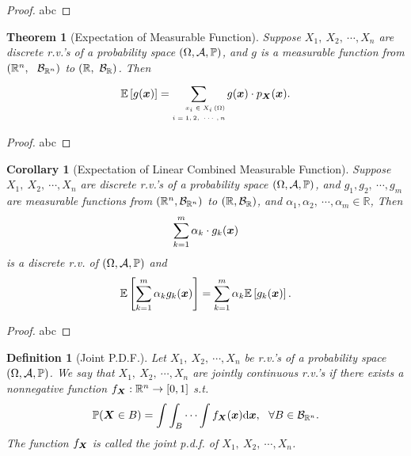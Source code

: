 \documentclass[openany,12pt]{book}
\newtheorem{theorem}{Theorem}[chapter]
\newtheorem{corollary}{Corollary}[chapter]
\newtheorem{definition}{Definition}[chapter]
\begin{document}
\begin{proof}
  abc
\end{proof}

\begin{theorem}[Expectation of Measurable Function]
Suppose $X_1,\ X_2,\ \cdots,X_n$ are discrete r.v.'s of a probability space $(\Omega,\mathcal{A},\mathbb{P})$, and $g$ is a measurable function from $(\mathbb{R}^n,\ \ \mb_{\mathbb{R}^n})$ to $(\mathbb{R},\ \mathcal{B}_\mathbb{R})$. Then
\[\mathbb{E}\left[ g(\bm{x}) \right] = \sum_{\mbox{\tiny$\begin{aligned}
x_{i} \in X_{i}\left( \Omega \right) \\
i = 1,2,\ \cdots,n \\
\end{aligned}$}}^{}{g(\bm{x}) \cdot p_{\bm{X}}(\bm{x}).}\]
\end{theorem}

\begin{proof}
  abc
\end{proof}

\begin{corollary}[Expectation of Linear Combined Measurable Function]
Suppose $X_1,\ X_2,\ \cdots,X_n$ are discrete r.v.'s of a probability space $(\Omega,\mathcal{A},\mathbb{P})$, and $g_1,g_2,\ \cdots,g_m$ are measurable functions from $(\mathbb{R}^n,\mathcal{B}_{\mathbb{R}^n})$ to $(\mathbb{R},\mathcal{B}_\mathbb{R})$, and $\alpha_1,\alpha_2,\ \cdots,\alpha_m\in\mathbb{R}$,
Then $$\sum_{k=1}^{m}\alpha_k\cdot g_k(\bm{x})$$ is a discrete r.v. of $(\Omega,\mathcal{A},\mathbb{P})$ and 
\[\mathbb{E}\left[ \sum_{k = 1}^{m}\alpha_{k}g_{k}(\bm{x}) \right] = \sum_{k = 1}^{m}\alpha_{k}\mathbb{E}\left[ g_{k}(\bm{x}) \right].\]
\end{corollary}

\begin{proof}
  abc
\end{proof}

\begin{definition}[Joint P.D.F.]
Let $X_1,\ X_2,\ \cdots,X_n$ be r.v.'s of a probability space $(\Omega,\mathcal{A},\mathbb{P})$. We say that $X_1,\ X_2,\ \cdots,X_n$ are jointly continuous r.v.'s if there exists a nonnegative function $f_{\bm{X}}:\mathbb{R}^n\to[0,1]$ s.t.
$$
\mathbb{P}(\bm{X}\in B)=\int\int_{B}\cdots\int f_{\bm{X}}(\bm{x})\mathrm{d} \bm{x},\ \ \forall B\in\mathcal{B}_{\mathbb{R}^n}.
$$
The function $f_{\bm{X}}$ is called the joint p.d.f. of $X_1,\ X_2,\ \cdots,X_n$.
\end{definition}
\end{document}
